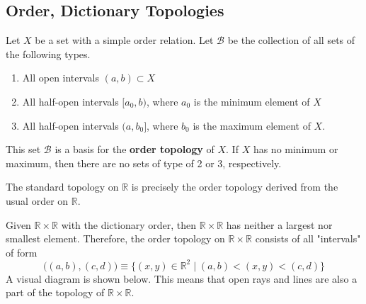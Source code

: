 \documentclass{article}
\begin{document}
  \subsection{Order, Dictionary Topologies} 

    \begin{definition}
      Let $X$ be a set with a simple order relation. Let $\mathscr{B}$ be the collection of all sets of the following types. 
      \begin{enumerate}
        \item All open intervals $(a, b) \subset X$
        \item All half-open intervals $[a_0, b)$, where $a_0$ is the minimum element of $X$
        \item All half-open intervals $(a, b_0]$, where $b_0$ is the maximum element of $X$. 
      \end{enumerate}
      This set $\mathscr{B}$ is a basis for the \textbf{order topology} of $X$. If $X$ has no minimum or maximum, then there are no sets of type of 2 or 3, respectively. 
    \end{definition}

    \begin{example}
      The standard topology on $\mathbb{R}$ is precisely the order topology derived from the usual order on $\mathbb{R}$. 
    \end{example}

    \begin{example}
      Given $\mathbb{R} \times \mathbb{R}$ with the dictionary order, then $\mathbb{R} \times \mathbb{R}$ has neither a largest nor smallest element. Therefore, the order topology on $\mathbb{R} \times \mathbb{R}$ consists of all "intervals" of form
      \[\big((a, b), (c, d) \big) \equiv  \{(x, y) \in \mathbb{R}^2 \; | \; (a, b) < (x, y) < (c, d)\}\]
      A visual diagram is shown below. This means that open rays and lines are also a part of the topology of $\mathbb{R} \times \mathbb{R}$. 

      \begin{center}
      \end{center}
    \end{example}
\end{document}
